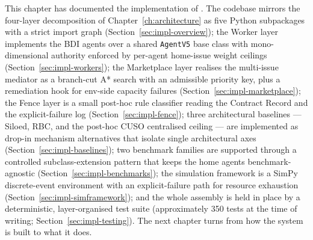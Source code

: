 This chapter has documented the implementation of \NEXUS{}. The
codebase mirrors the four-layer decomposition of
Chapter~\ref{ch:architecture} as five Python subpackages with a strict
import graph (Section~\ref{sec:impl-overview}); the Worker layer
implements the BDI agents over a shared
\texttt{AgentV5} base class with mono-dimensional authority enforced by
per-agent home-issue weight ceilings (Section~\ref{sec:impl-workers});
the Marketplace layer realises the multi-issue mediator as a branch-cut
A* search with an admissible priority key, plus a remediation hook for
env-side capacity failures (Section~\ref{sec:impl-marketplace}); the
Fence layer is a small post-hoc rule classifier reading the Contract
Record and the explicit-failure log (Section~\ref{sec:impl-fence});
three architectural baselines --- Siloed, RBC, and the post-hoc CUSO
centralised ceiling --- are implemented as drop-in mechanism
alternatives that isolate single architectural axes
(Section~\ref{sec:impl-baselines}); two benchmark families are
supported through a controlled subclass-extension pattern that keeps
the home agents benchmark-agnostic
(Section~\ref{sec:impl-benchmarks}); the simulation framework is a
SimPy discrete-event environment with an explicit-failure path for
resource exhaustion (Section~\ref{sec:impl-simframework}); and the
whole assembly is held in place by a deterministic, layer-organised
test suite (approximately 350 tests at the time of writing;
Section~\ref{sec:impl-testing}). The next
chapter turns from how the system is built to what it does.
